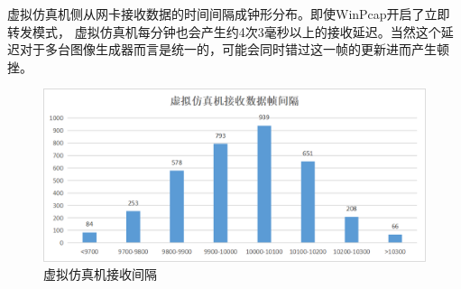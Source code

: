 虚拟仿真机侧从网卡接收数据的时间间隔成钟形分布。即使WinPcap开启了立即转发模式，
虚拟仿真机每分钟也会产生约4次3毫秒以上的接收延迟。当然这个延迟对于多台图像生成器而言是统一的，可能会同时错过这一帧的更新进而产生顿挫。
\begin{figure}[h!]
    \begin{center}
        \includegraphics[width=\textwidth]{pictures/interval.png}
        \caption{虚拟仿真机接收间隔}
        \label{interval}
    \end{center}
\end{figure}
